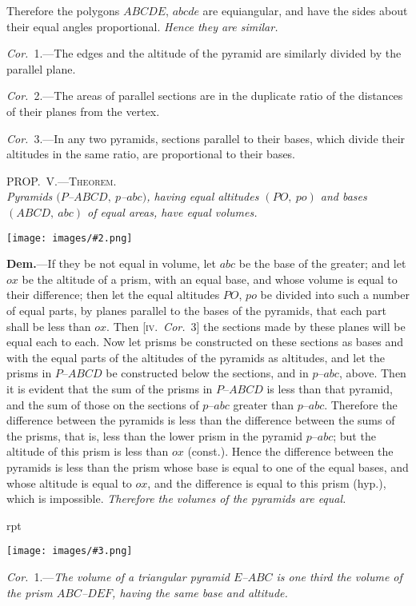 \documentclass[oneside]{book}
\newcounter{wrapwidth}
\newcommand\myprop[2]{
\bigskip\Needspace*{4\baselineskip}\begin{center}\textsc{#1}\\\medskip\emph{#2}\par\end{center}
}
\newcommand\imgflow[3]{
\setcounter{wrapwidth}{#1}
\begin{wrapfigure}[#2]{r}{\value{wrapwidth}pt}
\begin{center}
\vspace{-0.3in}
\texttt{[image: images/\#3.png]}
\end{center}
\end{wrapfigure}
}
\newcommand\imgcent[2]{
\begin{center}
\texttt{[image: images/\#2.png]}
\end{center}
}
\begin{document}
Therefore the polygons $ABCDE$, $abcde$ are equiangular,
and have the sides about their equal angles proportional.
\emph{Hence they are similar.}

\emph{Cor.}~1.---The edges and the altitude of the pyramid
are similarly divided by the parallel plane.

\emph{Cor.}~2.---The areas of parallel sections are in the
duplicate ratio of the distances of their planes from the
vertex.

\emph{Cor.}~3.---In any two pyramids, sections parallel to
their bases, which divide their altitudes in the same
ratio, are proportional to their bases.


\myprop{PROP\@.~V.---Theorem.}{Pyramids $(P$--$ABCD,\ p$--$abc)$, having equal altitudes
$(PO,\ po)$ and bases $(ABCD,\ abc)$ of equal areas, have equal
volumes.}

\imgcent{298}{f242}

\textbf{Dem.}---If they be not equal in volume, let $abc$ be
the base of the greater; and let $ox$ be the altitude of a
prism, with an equal base, and whose volume is equal
to their difference; then let the equal altitudes $PO$, $po$
be divided into such a number of equal parts, by planes
parallel to the bases of the pyramids, that each part
shall be less than $ox$. Then [\textsc{iv.}\ \emph{Cor.}~3] the sections
made by these planes will be equal each to each. Now
let prisms be constructed on these sections as bases and
with the equal parts of the altitudes of the pyramids as
altitudes, and let the prisms in $P$--$ABCD$ be constructed
below the sections, and in $p$--$abc$, above. Then it is
evident that the sum of the prisms in $P$--$ABCD$ is
less than that pyramid, and the sum of those on the
sections of $p$--$abc$ greater than $p$--$abc$. Therefore the
difference between the pyramids is less than the difference
between the sums of the prisms, that is, less than
the lower prism in the pyramid $p$--$abc$; but the altitude
of this prism is less than $ox$ (const.). Hence the difference
between the pyramids is less than the prism
whose base is equal to one of the equal bases, and
whose altitude is equal to $ox$, and the difference is
equal to this prism (hyp.), which is impossible. \emph{Therefore
the volumes of the pyramids are equal.}

\imgflow{113}{13}{f243}

\emph{Cor.}~1.---\textit{The volume of a triangular pyramid $E$--$ABC$
is one third the volume of the prism
$ABC$--$DEF$, having the same base
and altitude.}
\end{document}
